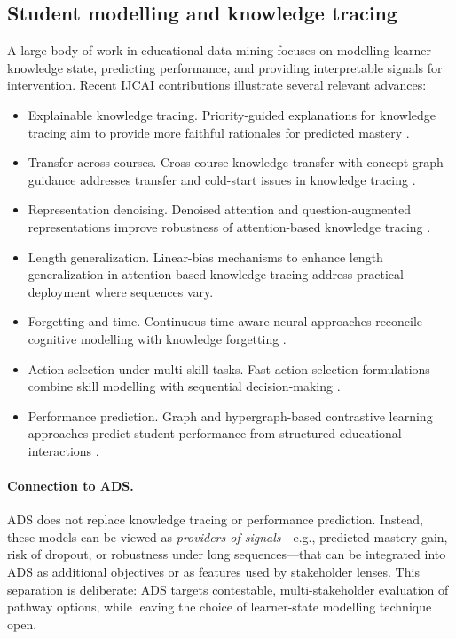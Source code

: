 \subsection{Student modelling and knowledge tracing}
\label{sec:rw-kt}

A large body of work in educational data mining focuses on modelling learner knowledge state, predicting performance, and providing interpretable signals for intervention.
Recent IJCAI contributions illustrate several relevant advances:
\begin{itemize}
    \item {Explainable knowledge tracing.} Priority-guided explanations for knowledge tracing aim to provide more faithful rationales for predicted mastery \cite{li2025pgexplainkt}.
    \item {Transfer across courses.} Cross-course knowledge transfer with concept-graph guidance addresses transfer and cold-start issues in knowledge tracing \cite{han2025transkt}.
    \item {Representation denoising.} Denoised attention and question-augmented representations improve robustness of attention-based knowledge tracing \cite{deng2025denoisekt}.
    \item {Length generalization.} Linear-bias mechanisms to enhance length generalization in attention-based knowledge tracing \cite{li2024stablekt} address practical deployment where sequences vary.
    \item {Forgetting and time.} Continuous time-aware neural approaches reconcile cognitive modelling with knowledge forgetting \cite{ma2022ctncm}.
    \item {Action selection under multi-skill tasks.} Fast action selection formulations combine skill modelling with sequential decision-making \cite{salomons2021bktpomdp}.
    \item {Performance prediction.} Graph and hypergraph-based contrastive learning approaches predict student performance from structured educational interactions \cite{song2025mhmgcl}.
\end{itemize}

\paragraph{Connection to ADS.}
ADS does not replace knowledge tracing or performance prediction.
Instead, these models can be viewed as \emph{providers of signals}---e.g., predicted mastery gain, risk of dropout, or robustness under long sequences---that can be integrated into ADS as additional objectives or as features used by stakeholder lenses.
This separation is deliberate: ADS targets contestable, multi-stakeholder evaluation of pathway options, while leaving the choice of learner-state modelling technique open.


